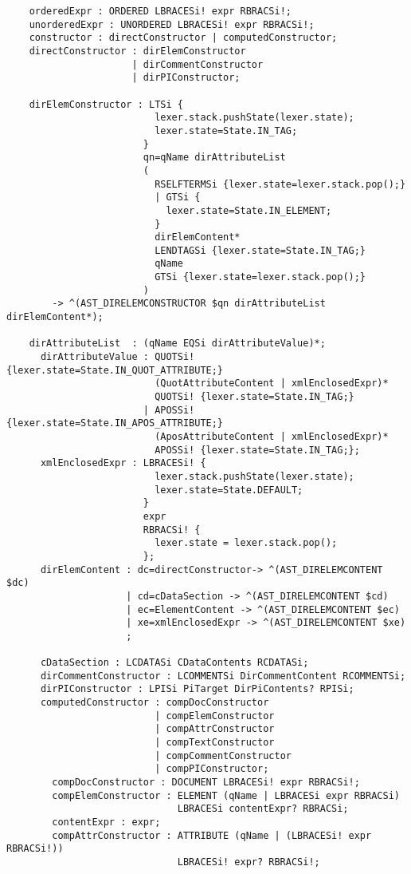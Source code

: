 \begin{verbatim}
    orderedExpr : ORDERED LBRACESi! expr RBRACSi!;
    unorderedExpr : UNORDERED LBRACESi! expr RBRACSi!;  
    constructor : directConstructor | computedConstructor;  
    directConstructor : dirElemConstructor
                      | dirCommentConstructor
                      | dirPIConstructor;
                  
    dirElemConstructor : LTSi {
                          lexer.stack.pushState(lexer.state); 
                          lexer.state=State.IN_TAG;
                        }
                        qn=qName dirAttributeList
                        (
                          RSELFTERMSi {lexer.state=lexer.stack.pop();}
                          | GTSi {
                            lexer.state=State.IN_ELEMENT;
                          }
                          dirElemContent* 
                          LENDTAGSi {lexer.state=State.IN_TAG;}
                          qName 
                          GTSi {lexer.state=lexer.stack.pop();}
                        )
        -> ^(AST_DIRELEMCONSTRUCTOR $qn dirAttributeList dirElemContent*);

    dirAttributeList  : (qName EQSi dirAttributeValue)*; 
      dirAttributeValue : QUOTSi! {lexer.state=State.IN_QUOT_ATTRIBUTE;}
                          (QuotAttributeContent | xmlEnclosedExpr)* 
                          QUOTSi! {lexer.state=State.IN_TAG;}
                        | APOSSi! {lexer.state=State.IN_APOS_ATTRIBUTE;}
                          (AposAttributeContent | xmlEnclosedExpr)* 
                          APOSSi! {lexer.state=State.IN_TAG;}; 
      xmlEnclosedExpr : LBRACESi! {
                          lexer.stack.pushState(lexer.state); 
                          lexer.state=State.DEFAULT;
                        }
                        expr 
                        RBRACSi! {
                          lexer.state = lexer.stack.pop();
                        };
      dirElemContent : dc=directConstructor-> ^(AST_DIRELEMCONTENT $dc)
                     | cd=cDataSection -> ^(AST_DIRELEMCONTENT $cd)
                     | ec=ElementContent -> ^(AST_DIRELEMCONTENT $ec)
                     | xe=xmlEnclosedExpr -> ^(AST_DIRELEMCONTENT $xe)
                     ;

      cDataSection : LCDATASi CDataContents RCDATASi;        
      dirCommentConstructor : LCOMMENTSi DirCommentContent RCOMMENTSi;
      dirPIConstructor : LPISi PiTarget DirPiContents? RPISi;
      computedConstructor : compDocConstructor
                          | compElemConstructor
                          | compAttrConstructor
                          | compTextConstructor
                          | compCommentConstructor
                          | compPIConstructor; 
        compDocConstructor : DOCUMENT LBRACESi! expr RBRACSi!;
        compElemConstructor : ELEMENT (qName | LBRACESi expr RBRACSi) 
                              LBRACESi contentExpr? RBRACSi;
        contentExpr : expr;                                
        compAttrConstructor : ATTRIBUTE (qName | (LBRACESi! expr RBRACSi!)) 
                              LBRACESi! expr? RBRACSi!;                  
        

\end{verbatim}
